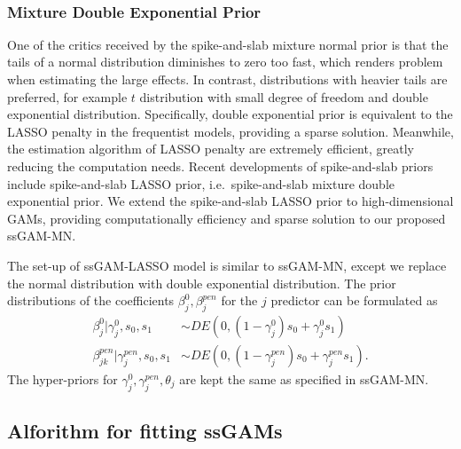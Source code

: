 \documentclass[AMA,STIX1COL,]{WileyNJD-v2}
\begin{document}
~

\hypertarget{mixture-double-exponential-prior}{%
\subsubsection{Mixture Double Exponential
Prior}\label{mixture-double-exponential-prior}}

One of the critics received by the spike-and-slab mixture normal prior
is that the tails of a normal distribution diminishes to zero too fast,
which renders problem when estimating the large effects. In contrast,
distributions with heavier tails are preferred, for example \(t\)
distribution with small degree of freedom and double exponential
distribution. Specifically, double exponential prior is equivalent to
the LASSO penalty in the frequentist models, providing a sparse
solution. Meanwhile, the estimation algorithm of LASSO penalty are
extremely efficient, greatly reducing the computation needs. Recent
developments of spike-and-slab priors include spike-and-slab LASSO
prior, i.e.~spike-and-slab mixture double exponential prior. We extend
the spike-and-slab LASSO prior to high-dimensional GAMs, providing
computationally efficiency and sparse solution to our proposed ssGAM-MN.

The set-up of ssGAM-LASSO model is similar to ssGAM-MN, except we
replace the normal distribution with double exponential distribution.
The prior distributions of the coefficients \(\beta^0_j, \beta^{pen}_j\)
for the \(j\) predictor can be formulated as \[
\begin{aligned}
  \beta^0_{j} |\gamma^0_{j},s_0,s_1 &\sim DE(0,(1-\gamma^0_{j}) s_0 + \gamma^0_{j} s_1)\\
  \beta^{pen}_{jk} | \gamma^{pen}_{j},s_0,s_1 &\sim DE(0,(1-\gamma^{pen}_{j}) s_0 + \gamma^{pen}_{j} s_1).
\end{aligned}
\] The hyper-priors for \(\gamma^0_j, \gamma^{pen}_j, \theta_j\) are
kept the same as specified in ssGAM-MN.

\hfill\break

\hypertarget{alforithm-for-fitting-ssgams}{%
\subsection{Alforithm for fitting
ssGAMs}\label{alforithm-for-fitting-ssgams}}
\end{document}
